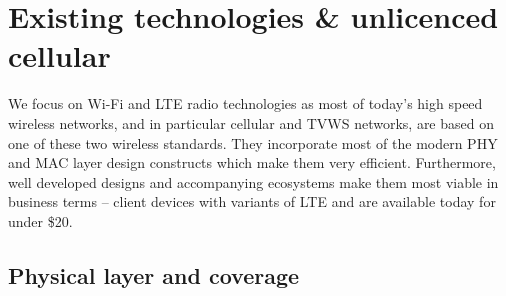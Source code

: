 

\section{Existing technologies \& unlicenced cellular}
We focus on Wi-Fi and LTE radio technologies as most of today's high speed wireless networks, and in particular cellular and TVWS networks, are based on one of these two wireless standards.
They incorporate most of the modern PHY and MAC layer design constructs which make them very efficient.
Furthermore, well developed designs and accompanying ecosystems make them most viable in business terms -- client devices with variants of LTE and \wf are available today for under \$20. 



\subsection{Physical layer and coverage}
\label{sec:PHY}


